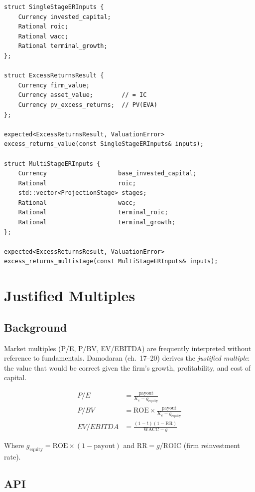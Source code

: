 \documentclass[12pt, a4paper, oneside]{book}
\newcommand{\WACC}{\ensuremath{\mathrm{WACC}}}
\newcommand{\ROIC}{\ensuremath{\mathrm{ROIC}}}
\newcommand{\ROE}{\ensuremath{\mathrm{ROE}}}
\newcommand{\Ke}{K_e}
\newcommand{\RR}{\mathrm{RR}}
\begin{document}
\begin{lstlisting}[style=cpp]
struct SingleStageERInputs {
    Currency invested_capital;
    Rational roic;
    Rational wacc;
    Rational terminal_growth;
};

struct ExcessReturnsResult {
    Currency firm_value;
    Currency asset_value;        // = IC
    Currency pv_excess_returns;  // PV(EVA)
};

expected<ExcessReturnsResult, ValuationError>
excess_returns_value(const SingleStageERInputs& inputs);

struct MultiStageERInputs {
    Currency                    base_invested_capital;
    Rational                    roic;
    std::vector<ProjectionStage> stages;
    Rational                    wacc;
    Rational                    terminal_roic;
    Rational                    terminal_growth;
};

expected<ExcessReturnsResult, ValuationError>
excess_returns_multistage(const MultiStageERInputs& inputs);
\end{lstlisting}

\chapter{Justified Multiples}

\section{Background}

Market multiples (P/E, P/BV, EV/EBITDA) are frequently interpreted without
reference to fundamentals. Damodaran (ch.~17--20) derives the
\emph{justified multiple}: the value that would be correct given the firm's
growth, profitability, and cost of capital.

\begin{align}
  P/E   &= \frac{\text{payout}}{\Ke - g_{\text{equity}}} \label{eq:pe} \\[4pt]
  P/BV  &= \ROE \times \frac{\text{payout}}{\Ke - g_{\text{equity}}} \label{eq:pb} \\[4pt]
  EV/EBITDA &= \frac{(1-t)(1-\RR)}{\WACC - g} \label{eq:ev_ebitda}
\end{align}

Where $g_{\text{equity}} = \ROE \times (1 - \text{payout})$ and
$\RR = g/\ROIC$ (firm reinvestment rate).

\section{API}
\end{document}
